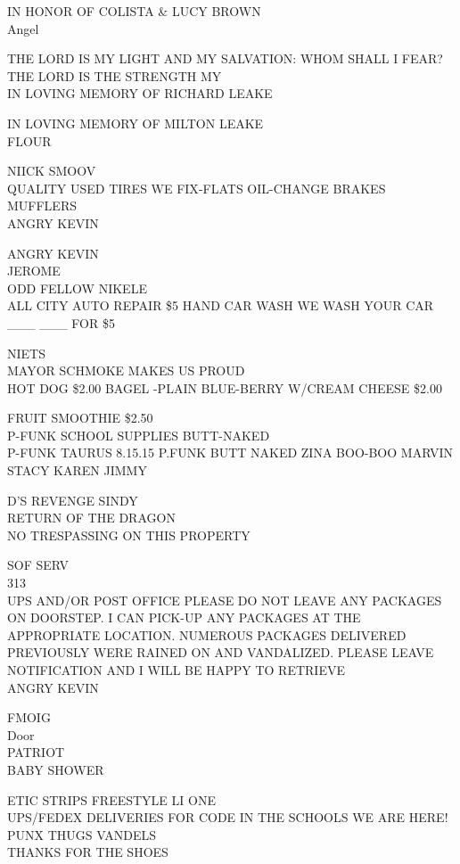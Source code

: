 \documentclass[10pt,letterpaper]{article}
\begin{document}
IN HONOR OF COLISTA \& LUCY BROWN\\
Angel

THE LORD IS MY LIGHT AND MY SALVATION: WHOM SHALL I FEAR?  THE LORD IS THE STRENGTH MY\\
IN LOVING MEMORY OF RICHARD LEAKE

IN LOVING MEMORY OF MILTON LEAKE\\
FLOUR

NIICK SMOOV\\
QUALITY USED TIRES WE FIX{-}FLATS OIL{-}CHANGE BRAKES MUFFLERS\\
ANGRY KEVIN

ANGRY KEVIN\\
JEROME\\
ODD FELLOW NIKELE\\
ALL CITY AUTO REPAIR \$5 HAND CAR WASH WE WASH YOUR CAR \_\_\_ \_\_\_ FOR \$5

NIETS\\
MAYOR SCHMOKE MAKES US PROUD\\
HOT DOG \$2.00 BAGEL {-}PLAIN BLUE{-}BERRY W/CREAM CHEESE \$2.00

FRUIT SMOOTHIE \$2.50\\
P{-}FUNK SCHOOL SUPPLIES BUTT{-}NAKED\\
P{-}FUNK TAURUS 8.15.15 P.FUNK BUTT NAKED ZINA BOO{-}BOO MARVIN\\
STACY KAREN JIMMY

D'S REVENGE SINDY\\
RETURN OF THE DRAGON\\
NO TRESPASSING ON THIS PROPERTY

SOF SERV\\
313\\
UPS AND/OR POST OFFICE PLEASE DO NOT LEAVE ANY PACKAGES ON DOORSTEP.  I CAN PICK{-}UP ANY PACKAGES AT THE APPROPRIATE LOCATION.  NUMEROUS PACKAGES DELIVERED PREVIOUSLY WERE RAINED ON AND VANDALIZED.  PLEASE LEAVE NOTIFICATION AND I WILL BE HAPPY TO RETRIEVE\\
ANGRY KEVIN

FMOIG\\
Door\\
PATRIOT\\
BABY SHOWER

ETIC STRIPS FREESTYLE LI ONE\\
UPS/FEDEX DELIVERIES FOR CODE IN THE SCHOOLS WE ARE HERE!\\
PUNX THUGS VANDELS\\
THANKS FOR THE SHOES
\end{document}
